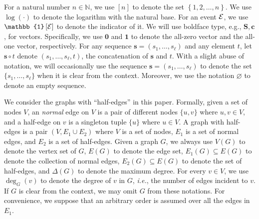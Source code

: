\documentclass[11pt]{article}
\newcommand{\set}[1]{\left\{#1\right\}}
\newcommand{\defeq}{\triangleq} \renewcommand{\d}{\,\-d}
\newcommand{\id}[1]{\mathbb{1}\left[#1\right]}
\def\IE{\emph{i.e.}}
\newcommand{\seqS}{\boldsymbol{s}}
\newcommand{\qgl}[1]{{\color{purple}{#1}}}
\newcommand{\hktodo}[1]{{\color{blue}{#1}}}
\begin{document}
For a natural number $n \in \mathbb N$, we use $[n]$ to denote the set $\set{1, 2, \ldots, n}$.
We use $\log(\cdot)$ to denote the logarithm with the natural base.
For an event $\mathcal{E}$, we use $\id{\+E}$ to denote the indicator of it. 
We will use boldface type, e.g., $\boldsymbol{S},\boldsymbol{c}$, for vectors.
Specifically, we use $\boldsymbol{0}$ and $\boldsymbol{1}$ to denote the all-zero vector and the all-one vector, respectively.
For any sequence $\seqS = (s_1, \ldots, s_\ell)$ and any element $t$, let $\seqS \circ t$ denote $(s_1, \ldots, s_\ell,t)$, the concatenation of $\seqS$ and $t$.
With a slight abuse of notation, we will occasionally use the sequence $\seqS= (s_1, \ldots, s_\ell)$ to denote the set $\{s_1, \ldots, s_\ell\}$ when it is clear from the context.
Moreover, we use the notation $\varnothing$ to denote an empty sequence.

We consider the graphs with ``half-edges'' in this paper.
Formally, given a set of nodes $V$, an \emph{normal} edge on $V$ is a pair of different nodes $\{u,v\}$ where $u,v\in V$,
and a half-edge on $v$ is a singleton tuple $\{u\}$ where $u \in V$.
A graph with half-edges is a pair $(V,E_1\cup E_2)$ where $V$ is a set of nodes, $E_1$ is a set of normal edges,
and $E_2$ is a set of half-edges. 
\qgl{To distinguish the graph with no half-edges, we will consistently refer to the graph with half-edges as $G=\left(V,E=E_1\cup E_2\right)$. One can verify that the notations $\mu_\Phi$, $Z_\Phi$, e.t.c., can be generalized to the instances where the graph has half edges.}
Given a graph $G$, we always use $V(G)$ to denote the vertex set of $G$, $E(G)$ to denote the edge set, $E_1(G) \subseteq E(G)$ to denote the collection of normal edges, $E_2(G)\subseteq E(G)$ to denote the set of half-edges, and $\Delta(G)$ to denote the maximum degree. 
For every $v \in V$, we use $\deg_G(v)$ to denote the degree of $v$ in $G$, \IE, the number of edges incident to $v$.
If $G$ is clear from the context, we may omit $G$ from these notations.
For convenience, we suppose that an arbitrary order is assumed over all the edges in $E_1$.
\end{document}

